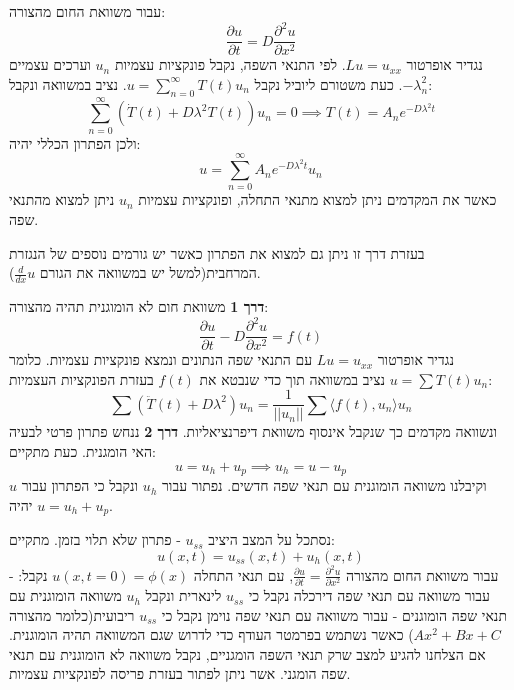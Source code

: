 \documentclass{tstextbook}
\begin{document}
\begin{proposition}
עבור משוואת החום מהצורה:
$$\frac{\partial u}{\partial t} = D\frac{\partial^2 u}{\partial x^2}$$
נגדיר אופרטור \(Lu=u_{x x}\). לפי התנאי השפה, נקבל פונקציות עצמיות \(u_{n}\) וערכים עצמיים \(-\lambda_{n}^2\). כעת משטורם ליוביל נקבל \(u=\sum_{n=0}^{\infty} T(t)u_{n}\). נציב במשוואה ונקבל:
$$\sum_{n=0}^{\infty} \left( \dot{T}(t)+D\lambda^2T(t) \right) u_{n}=0\implies T(t)=A_{n}e^{-D\lambda^2t}$$
ולכן הפתרון הכללי יהיה:
$$u=\sum_{n=0}^{\infty} A_{n}e^{-D\lambda^2t}u_{n}$$
כאשר את המקדמים ניתן למצוא מתנאי התחלה, ופונקציות עצמיות \(u_{n}\) ניתן למצוא מהתנאי שפה.

\end{proposition}
\begin{remark}
בעזרת דרך זו ניתן גם למצוא את הפתרון כאשר יש גורמים נוספים של הנגזרת המרחבית(למשל יש במשוואה את הגורם \(\frac{d}{dx}u\)).

\end{remark}
\begin{proposition}
\textbf{דרך 1}
משוואת חום לא הומוגנית תהיה מהצורה:
$$\frac{\partial u}{\partial t}-D\frac{\partial ^2u}{\partial x^2}=f(t)$$
נגדיר אופרטור \(Lu=u_{x x}\) עם התנאי שפה הנתונים ונמצא פונקציות עצמיות. כלומר \(u=\sum T(t)u_{n}\) נציב במשוואה תוך כדי שנבטא את \(f(t)\) בעזרת הפונקציות העצמיות:
$$\sum \left( \ddot{T}(t)+D\lambda^2 \right) u_{n} =\frac{1}{||u_{n}||}\sum \langle f(t),u_{n}\rangle u_{n}$$
ונשוואה מקדמים כך שנקבל אינסוף משוואת דיפרנציאליות.
\textbf{דרך 2}
ננחש פתרון פרטי לבעיה האי הומגנית. כעת מתקיים:
$$u=u_{h}+u_{p}\implies u_{h}=u-u_{p}$$
וקיבלנו משוואה הומוגנית עם תנאי שפה חדשים. נפתור עבור \(u_{h}\) ונקבל כי הפתרון עבור \(u\) יהיה \(u=u_{h}+u_{p}\).

\end{proposition}
\begin{proposition}
נסתכל על המצב היציב \(u_{ss}\) - פתרון שלא תלוי בזמן. מתקיים:
$$u(x,t)=u_{ss}(x,t)+u_{h}(x,t)$$
עבור משוואת החום מהצורה \(\frac{\partial u}{\partial t}=\frac{\partial ^2u}{\partial x^2}\), עם תנאי התחלה \(u(x,t=0)=\phi(x)\) נקבל:
- עבור משוואה עם תנאי שפה דירכלה נקבל כי \(u_{ss}\) לינארית ונקבל \(u_{h}\) משוואה הומוגנית עם תנאי שפה הומוגנים
- עבור משוואה עם תנאי שפה נוימן נקבל כי \(u_{ss}\) ריבועית(כלומר מהצורה \(Ax^2+Bx+C\)) כאשר נשתמש בפרמטר העודף כדי לדרוש שגם המשוואה תהיה הומוגנית. אם הצלחנו להגיע למצב שרק תנאי השפה הומגניים, נקבל משוואה לא הומוגנית עם תנאי שפה הומגני. אשר ניתן לפתור בעזרת פריסה לפונקציות עצמיות.

\end{proposition}
\end{document}
